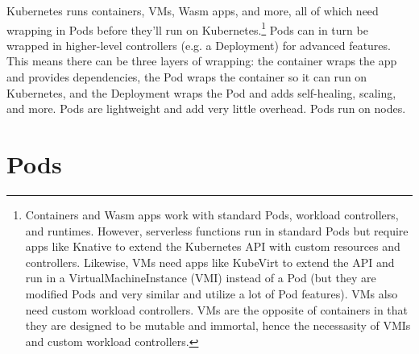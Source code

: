 \documentclass[8pt, table, xcdraw]{article}%
\begin{document}
Kubernetes runs containers, VMs, Wasm apps, and more, all of which need wrapping in Pods before they’ll run on Kubernetes.\footnote{Containers and Wasm apps work with standard Pods, workload controllers, and runtimes. However, serverless functions run in standard Pods but require apps like Knative to extend the Kubernetes API with custom resources and controllers. Likewise, VMs need apps like KubeVirt to extend the API and run in a VirtualMachineInstance (VMI) instead of a Pod (but they are modified Pods and very similar and utilize a lot of Pod features). VMs also need custom workload controllers. VMs are the opposite of containers in that they are designed to be mutable and immortal, hence the necessasity of VMIs and custom workload controllers.} Pods can in turn be wrapped in higher-level controllers (e.g. a Deployment) for advanced features. This means there can be three layers of wrapping: the container wraps the app and provides dependencies, the Pod wraps the container so it can run on Kubernetes, and the Deployment wraps the Pod and adds self-healing, scaling, and more. Pods are lightweight and add very little overhead. Pods run on nodes.

\section{Pods}
\end{document}
